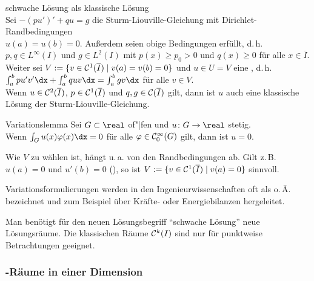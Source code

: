 \begin{Satz}{schwache Lösung als klassische Lösung}\\
    Sei $-(pu')' + qu = g$ die Sturm-Liouville-Gleichung mit
    Dirichlet-Randbedingungen\\
    $u(a) = u(b) = 0$.
    Außerdem seien obige Bedingungen erfüllt, d.\,h.\\
    $p, q \in L^\infty(I)$ und $g \in L^2(I)$ mit
    $p(x) \ge p_0 > 0$ und $q(x) \ge 0$ für alle $x \in \overline{I}$.\\
    Weiter sei $V := \{v \in \mathcal{C}^1(\overline{I}) \;|\; v(a) = v(b) = 0\}$
    und $u \in U = V$ eine , d.\,h.
    $\int_a^b pu'v'\dx + \int_a^b quv\dx = \int_a^b gv\dx$ für alle $v \in V$.\\
    Wenn $u \in \mathcal{C}^2(\overline{I})$, $p \in \mathcal{C}^1(\overline{I})$ und
    $q, g \in \mathcal{C}(\overline{I})$ gilt, dann ist $u$ auch eine klassische
    Lösung der Sturm-Liouville-Gleichung.
\end{Satz}

\begin{Lemma}{Variationslemma}
    Sei $G \subset \real$ of"|fen und $u\colon G \rightarrow \real$ stetig.\\
    Wenn $\int_G u(x)\varphi(x)\dx = 0$ für alle $\varphi \in \mathcal{C}_0^\infty(G)$
    gilt, dann ist $u = 0$.
\end{Lemma}

\linie

\begin{Bem}
    Wie $V$ zu wählen ist, hängt u.\,a. von den Randbedingungen ab.
    Gilt z.\,B. $u(a) = 0$ und $u'(b) = 0$
    (), so ist
    $V := \{v \in \mathcal{C}^1(\overline{I}) \;|\; v(a) = 0\}$ sinnvoll.
\end{Bem}

\begin{Bem}
    Variationsformulierungen werden in den Ingenieurwissenschaften oft als
     o.\,Ä. bezeichnet
    und zum Beispiel über Kräfte- oder Energiebilanzen hergeleitet.
\end{Bem}

\begin{Bem}
    Man benötigt für den neuen Lösungsbegriff "`schwache Lösung"'
    neue Lösungsräume.
    Die klassischen Räume $\mathcal{C}^k(I)$ sind nur für punktweise Betrachtungen
    geeignet.
\end{Bem}

\subsubsection{%
    -Räume in einer Dimension%
}

